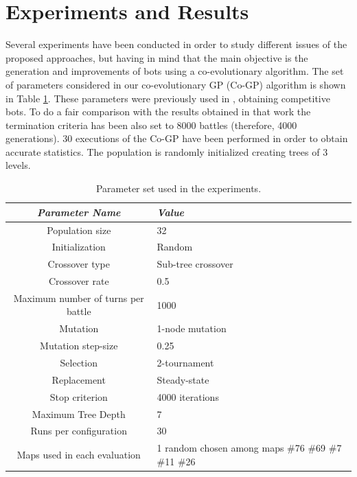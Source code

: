 \documentclass[conference]{IEEEtran}
\begin{document}


%
\section{Experiments and Results}
\label{sec:experiments}

Several experiments have been conducted in order to study different issues of the proposed approaches, but having in mind that the main objective is the generation and improvements of bots using a co-evolutionary algorithm. The set of parameters considered in our co-evolutionary GP (Co-GP) algorithm is shown in Table \ref{tab:parameters}.
These parameters were previously used in \cite{GarciaGP14}, obtaining competitive bots. To do a fair comparison with the results obtained in that work the termination criteria has been also set to 8000 battles (therefore, 4000 generations). 30 executions of the Co-GP have been performed in order to obtain accurate statistics.   The population is randomly initialized creating trees of 3 levels. %


\begin{table}
\begin{center}
\begin{tabular}{|c|p{2.5cm}|}
\hline
{\em Parameter Name} & {\em Value} \\\hline \hline
Population size & 32 \\\hline
Initialization & Random \\ \hline
Crossover type & Sub-tree crossover \\ \hline
Crossover rate & 0.5\\ \hline
Maximum number of turns per battle & 1000 \\\hline
Mutation  & 1-node mutation\\ \hline
Mutation step-size & 0.25 \\ \hline
Selection & 2-tournament \\ \hline
Replacement & Steady-state\\ \hline
Stop criterion & 4000 iterations \\ \hline
Maximum Tree Depth & 7  \\ \hline

Runs per configuration & 30 \\ \hline
Maps used in each evaluation & 1 random chosen among maps \#76 \#69 \#7 \#11 \#26\\ \hline
\end{tabular}
\caption{Parameter set used in the experiments.}     %
\label{tab:parameters}
\end{center}
\end{table}
\end{document}
